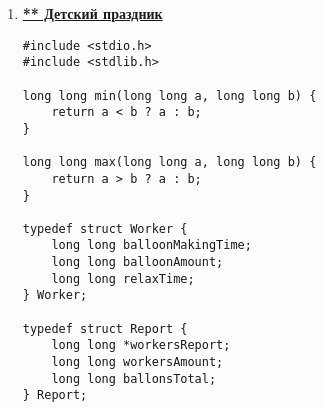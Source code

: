 \documentclass[a4paper,14pt]{extarticle}
\newcommand\codeforcesresult[1]{
    \begin{center}
        \texttt{[image: \#1]}
    \end{center}
}
\begin{document}
\begin{enumerate}
\begin{verbatim}
        long long left = -1;
        long long right = heroesAmount;
        while (right - left > 1) {
            long long middle = left + (right - left) / 2;

            if (heroesPower[middle] < defendingDragonPower)
                left = middle;
            else
                right = middle;
        }

        long long totalMoneySpent;
        if (left == -1)
            totalMoneySpent = max(0, defendingDragonPower - heroesPower[right]) +
                              max(0, attackingDragonPower - (totalHeroPower - heroesPower[right]));
        else if (right == heroesAmount)
            totalMoneySpent = max(0, defendingDragonPower - heroesPower[left]) +
                              max(0, attackingDragonPower - (totalHeroPower - heroesPower[left]));
        else
            totalMoneySpent = min(max(0, defendingDragonPower - heroesPower[right]) +
                                  max(0, attackingDragonPower - (totalHeroPower - heroesPower[right])),
                                  max(0, defendingDragonPower - heroesPower[left]) +
                                  max(0, attackingDragonPower - (totalHeroPower - heroesPower[left])));

        printf("%lld\n", totalMoneySpent);
    }

    free(heroesPower);

    return 0;
}


\end{verbatim}
\codeforcesresult{/codeforceresults/1574C}
\href{https://github.com/IAmProgrammist/programming-and-algorithmization-basics/blob/c/lab10/18.c}{\underline{Ссылка на репозиторий}}

\newpage
\item \href{https://codeforces.com/edu/course/2/lesson/6/2/practice/contest/283932/problem/D}{\textbf{** Детский праздник}}
\begin{verbatim}
#include <stdio.h>
#include <stdlib.h>

long long min(long long a, long long b) {
    return a < b ? a : b;
}

long long max(long long a, long long b) {
    return a > b ? a : b;
}

typedef struct Worker {
    long long balloonMakingTime;
    long long balloonAmount;
    long long relaxTime;
} Worker;

typedef struct Report {
    long long *workersReport;
    long long workersAmount;
    long long ballonsTotal;
} Report;


\end{verbatim}
\end{enumerate}
\end{document}
